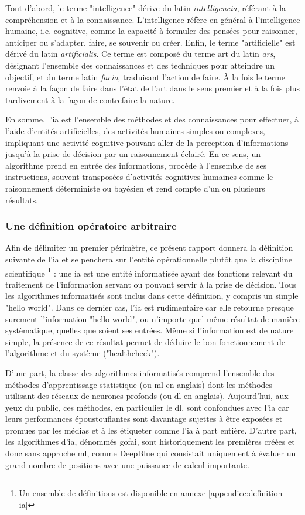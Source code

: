 Tout d'abord, le terme "intelligence" dérive du latin \textit{intelligencia}, référant à la compréhension et à la connaissance. L'intelligence réfère en général à l'intelligence humaine, i.e. cognitive, comme la capacité à formuler des pensées pour raisonner, anticiper ou s'adapter, faire, se souvenir ou créer.
Enfin, le terme "artificielle" est dérivé du latin \textit{artificialis}. Ce terme est composé du terme art du latin \textit{ars}, désignant l'ensemble des connaissances et des techniques pour atteindre un objectif, et du terme latin \textit{facio}, traduisant l'action de faire. À la fois le terme renvoie à la façon de faire dans l'état de l'art dans le sens premier et à la fois plus tardivement à la façon de contrefaire la nature.

En somme, l'\gls{ia} est l'ensemble des méthodes et des connaissances pour effectuer, à l'aide d'entités artificielles, des activités humaines simples ou complexes, impliquant une activité cognitive pouvant aller de la perception d'informations jusqu'à la prise de décision par un raisonnement éclairé. En ce sens, un algorithme prend en entrée des informations, procède à l'ensemble de ses instructions, souvent transposées d'activités cognitives humaines comme le raisonnement déterministe ou bayésien et rend compte d'un ou plusieurs résultats.

\subsubsection{Une définition opératoire arbitraire}
Afin de délimiter un premier périmètre, ce présent rapport donnera la définition suivante de l'\gls{ia} et se penchera sur l'entité opérationnelle plutôt que la discipline scientifique \footnote{Un ensemble de définitions est disponible en annexe \ref{appendice:definition-ia}} : une \gls{ia} est une entité informatisée ayant des fonctions relevant du traitement de l'information servant ou pouvant servir à la prise de décision. Tous les algorithmes informatisés sont inclus dans cette définition, y compris un simple "hello world". Dans ce dernier cas, l'\gls{ia} est rudimentaire car elle retourne presque surement l'information "hello world", ou n'importe quel même résultat de manière systèmatique, quelles que soient ses entrées. Même si l'information est de nature simple, la présence de ce résultat permet de déduire le bon fonctionnement de l'algorithme et du système ("healthcheck").

D'une part, la classe des algorithmes informatisés comprend l'ensemble des méthodes d'apprentissage statistique (ou \gls{ml} en anglais) dont les méthodes utilisant des réseaux de neurones profonds (ou \gls{dl} en anglais). Aujourd'hui, aux yeux du public, ces méthodes, en particulier le \gls{dl}, sont confondues avec l'\gls{ia} car leurs performances époustouflantes sont davantage sujettes à être exposées et promues par les médias et à les étiqueter comme l'\gls{ia} à part entière. D'autre part, les algorithmes d'\gls{ia}, dénommés \gls{gofai}, sont historiquement les premières créées et donc sans approche \gls{ml}, comme DeepBlue qui consistait uniquement à évaluer un grand nombre de positions avec une puissance de calcul importante.

